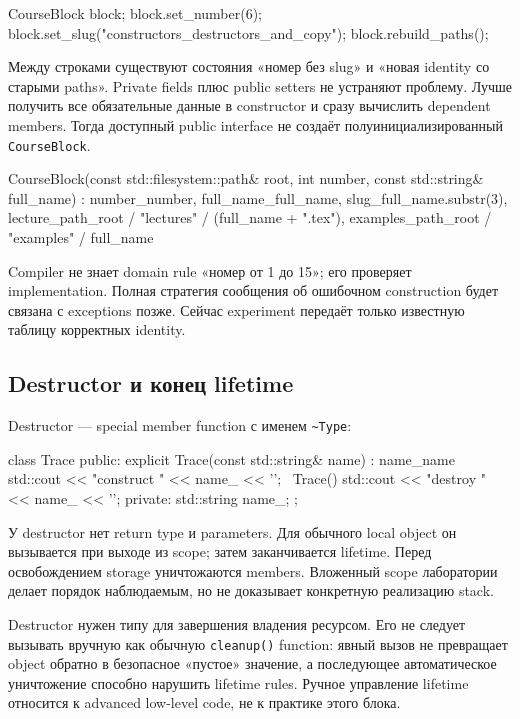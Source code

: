\begin{cppcode}
CourseBlock block;
block.set_number(6);
block.set_slug("constructors_destructors_and_copy");
block.rebuild_paths();
\end{cppcode}

Между строками существуют состояния «номер без slug» и «новая identity со
старыми paths». Private fields плюс public setters не устраняют проблему.
Лучше получить все обязательные данные в constructor и сразу вычислить
dependent members. Тогда доступный public interface не создаёт
полуинициализированный \texttt{CourseBlock}.

\begin{cppcode}
CourseBlock(const std::filesystem::path& root, int number,
            const std::string& full_name)
    : number_{number},
      full_name_{full_name},
      slug_{full_name.substr(3)},
      lecture_path_{root / "lectures" / (full_name + ".tex")},
      examples_path_{root / "examples" / full_name} {}
\end{cppcode}

Compiler не знает domain rule «номер от 1 до 15»; его проверяет
implementation. Полная стратегия сообщения об ошибочном construction будет
связана с exceptions позже. Сейчас experiment передаёт только известную
таблицу корректных identity.

\subsection{Destructor и конец lifetime}

Destructor --- special member function с именем \texttt{\textasciitilde Type}:

\begin{cppcode}
class Trace {
public:
    explicit Trace(const std::string& name) : name_{name} {
        std::cout << "construct " << name_ << '\n';
    }
    ~Trace() {
        std::cout << "destroy " << name_ << '\n';
    }
private:
    std::string name_;
};
\end{cppcode}

У destructor нет return type и parameters. Для обычного local object он
вызывается при выходе из scope; затем заканчивается lifetime. Перед
освобождением storage уничтожаются members. Вложенный scope лаборатории
делает порядок наблюдаемым, но не доказывает конкретную реализацию stack.

Destructor нужен типу для завершения владения ресурсом. Его не следует
вызывать вручную как обычную \texttt{cleanup()} function: явный вызов не
превращает object обратно в безопасное «пустое» значение, а последующее
автоматическое уничтожение способно нарушить lifetime rules. Ручное управление
lifetime относится к advanced low-level code, не к практике этого блока.

